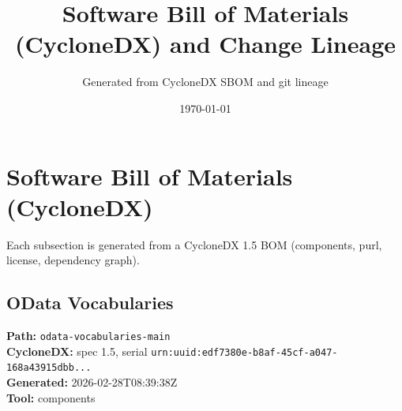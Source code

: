 \documentclass[11pt]{article}
\title{Software Bill of Materials (CycloneDX) and Change Lineage}
\author{Generated from CycloneDX SBOM and git lineage}
\date{\today}
\begin{document}
\maketitle
\tableofcontents
\newpage
\section{Software Bill of Materials (CycloneDX)}
Each subsection is generated from a CycloneDX 1.5 BOM (components, purl, license, dependency graph).

\subsection{OData Vocabularies}
\textbf{Path:} \texttt{odata-vocabularies-main}
\\ \textbf{CycloneDX:} spec 1.5, serial \texttt{urn:uuid:edf7380e-b8af-45cf-a047-168a43915dbb...}
\\ \textbf{Generated:} 2026-02-28T08:39:38Z
\\ \textbf{Tool:} components
\end{document}
